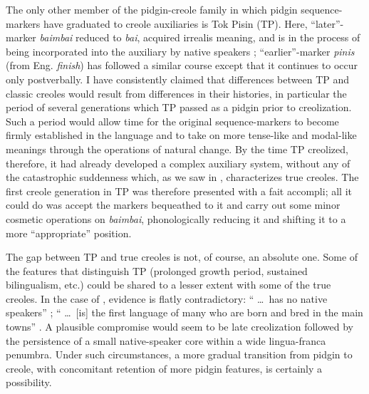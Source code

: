 The only other member of the pidgin-creole family in which pidgin sequence-markers have graduated to creole auxiliaries is Tok Pisin (TP). Here, ``later''-marker \textit{baimbai} reduced to \textit{bai}, acquired irrealis meaning, and is in the process of being incorporated into the auxiliary by native speakers \citep{SankoffEtAl1974}; ``earlier''-marker \textit{pinis} (from Eng. \textit{finish}) has followed a similar course except that it continues to occur only postverbally. I have consistently claimed that differences between TP and classic creoles would result from differences in their histories, in particular the period of several genera\-tions which TP passed as a pidgin prior to creolization. Such a period would allow time for the original sequence-markers to become firmly established in the language and to take on more tense-like and modal-like meanings through the operations of natural change. By the time TP creolized, therefore, it had already developed a complex auxiliary system, without any of the catastrophic suddenness which, as we saw
in , characterizes true creoles. The first creole generation in TP was therefore presented with a fait accompli; all it could do was accept the markers bequeathed to it and carry out some minor cosmetic operations on \textit{baimbai}, phonologically reducing it and shifting it to a more ``appropriate'' position.

The gap between TP and true creoles is not, of course, an abso\-lute one. Some of the features that distinguish TP (prolonged growth period, sustained bilingualism, etc.) could be shared to a lesser extent with some of the true creoles. In the case of , evidence is flatly contradictory: `` \ldots~has no native speakers'' \citep{Alleyne1979}; `` \ldots~[is] the first language of many who are born and bred in the main towns'' \citep[vii]{Wilson1962}. A plausible compromise would seem to be late creolization followed by the persistence of a small native-speaker core within a wide lingua-franca penumbra. Under such circumstances, a more gradual transition from pidgin to creole, with concomitant retention of more pidgin features, is certainly a possibility. 

